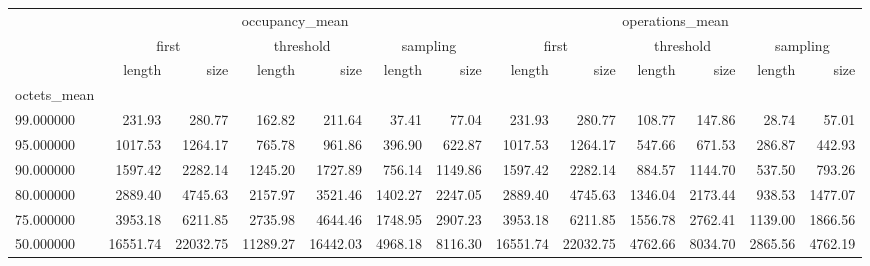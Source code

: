 \begin{tabular}{lrrrrrrrrrrrr}
\toprule
 & \multicolumn{6}{c}{occupancy_mean} & \multicolumn{6}{c}{operations_mean} \\
 & \multicolumn{2}{c}{first} & \multicolumn{2}{c}{threshold} & \multicolumn{2}{c}{sampling} & \multicolumn{2}{c}{first} & \multicolumn{2}{c}{threshold} & \multicolumn{2}{c}{sampling} \\
 & length & size & length & size & length & size & length & size & length & size & length & size \\
octets_mean &  &  &  &  &  &  &  &  &  &  &  &  \\
\midrule
99.000000 & 231.93 & 280.77 & 162.82 & 211.64 & 37.41 & 77.04 & 231.93 & 280.77 & 108.77 & 147.86 & 28.74 & 57.01 \\
95.000000 & 1017.53 & 1264.17 & 765.78 & 961.86 & 396.90 & 622.87 & 1017.53 & 1264.17 & 547.66 & 671.53 & 286.87 & 442.93 \\
90.000000 & 1597.42 & 2282.14 & 1245.20 & 1727.89 & 756.14 & 1149.86 & 1597.42 & 2282.14 & 884.57 & 1144.70 & 537.50 & 793.26 \\
80.000000 & 2889.40 & 4745.63 & 2157.97 & 3521.46 & 1402.27 & 2247.05 & 2889.40 & 4745.63 & 1346.04 & 2173.44 & 938.53 & 1477.07 \\
75.000000 & 3953.18 & 6211.85 & 2735.98 & 4644.46 & 1748.95 & 2907.23 & 3953.18 & 6211.85 & 1556.78 & 2762.41 & 1139.00 & 1866.56 \\
50.000000 & 16551.74 & 22032.75 & 11289.27 & 16442.03 & 4968.18 & 8116.30 & 16551.74 & 22032.75 & 4762.66 & 8034.70 & 2865.56 & 4762.19 \\
\bottomrule
\end{tabular}
